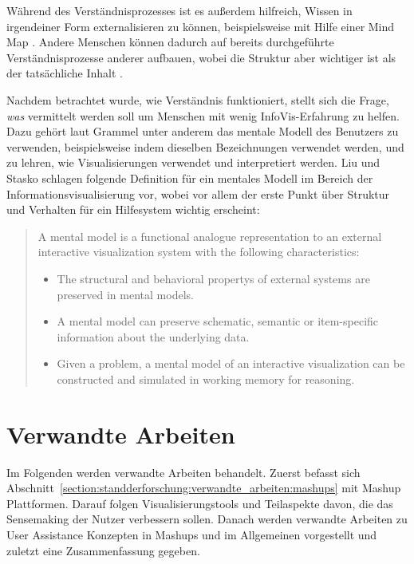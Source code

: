 \documentclass[
	headsepline,
	footsepline,
	fontsize=12pt,
	bibliography=totoc
]{scrbook}
\begin{document}

Während des Verständnisprozesses ist es außerdem hilfreich, Wissen in irgendeiner Form externalisieren zu können, beispielsweise mit Hilfe einer Mind Map \cite{Qu2005, Novak2007, Umapathy2010}. Andere Menschen können dadurch auf bereits durchgeführte Verständnisprozesse anderer aufbauen, wobei die Struktur aber wichtiger ist als der tatsächliche Inhalt \cite{Fisher2012}.

Nachdem betrachtet wurde, wie Verständnis funktioniert, stellt sich die Frage, \emph{was} vermittelt werden soll um Menschen mit wenig InfoVis-Erfahrung zu helfen. Dazu gehört laut Grammel \cite[S. 127]{Grammel2012} unter anderem das mentale Modell des Benutzers zu verwenden, beispielsweise indem dieselben Bezeichnungen verwendet werden, und zu lehren, wie Visualisierungen verwendet und interpretiert werden.  Liu und Stasko \cite{Liu2010} schlagen folgende Definition für ein mentales Modell im Bereich der Informationsvisualisierung vor, wobei vor allem der erste Punkt über Struktur und Verhalten für ein Hilfesystem wichtig erscheint:

\begin{quote}
A mental model is a functional analogue representation to an external interactive visualization system with the following characteristics:
	\begin{itemize}
		\item The structural and behavioral propertys of external systems are preserved in mental models.
		\item A mental model can preserve schematic, semantic or item-specific information about the underlying data.
		\item Given a problem, a mental model of an interactive visualization can be constructed and simulated in working memory for reasoning.
	\end{itemize}
\end{quote}

\section{Verwandte Arbeiten}
\label{section:standderforschung:verwandte_arbeiten}

Im Folgenden werden verwandte Arbeiten behandelt. Zuerst befasst sich Abschnitt~\ref{section:standderforschung:verwandte_arbeiten:mashups} mit Mashup Plattformen. Darauf folgen Visualisierungstools und Teilaspekte davon, die das Sensemaking der Nutzer verbessern sollen. Danach werden verwandte Arbeiten zu User Assistance Konzepten in Mashups und im Allgemeinen vorgestellt und zuletzt eine Zusammenfassung gegeben.
\end{document}
